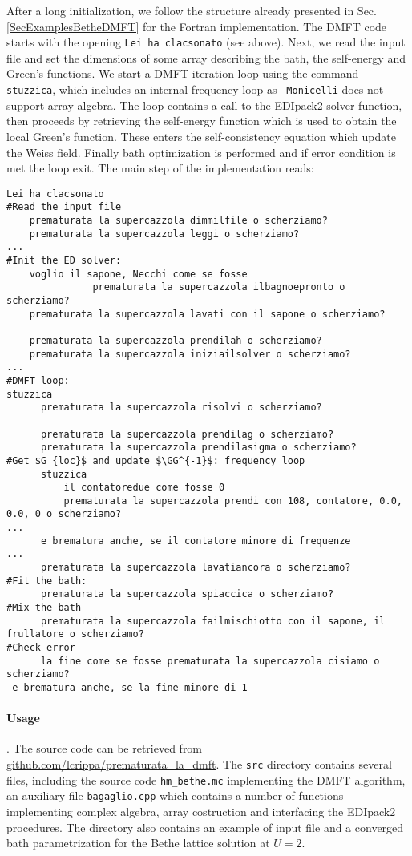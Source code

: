 \documentclass[preprint,3p,10pt]{elsarticle}
\newcommand{\secu}[1]
{Sec.\,\ref{#1}}
\def\GG{{\cal G}} \def\SS{{\cal S}}
\def\NAME{{\rm EDIpack2}\xspace}
\begin{document}
After a long initialization, we follow the structure already presented
in \secu{SecExamplesBetheDMFT} for the Fortran implementation.
The DMFT code starts with the opening {\tt Lei ha clacsonato} (see
above). Next, we read the input file and set the dimensions of some
array describing the bath, the self-energy and Green's
functions. We start a DMFT iteration loop using the command {\tt
  stuzzica}, which includes an internal frequency loop as {\tt
  Monicelli} does not support array algebra.
The loop contains a call to the \NAME solver function, then proceeds
by retrieving the self-energy function which is used to obtain the
local Green's function. These enters the self-consistency equation
which update the Weiss field. Finally bath optimization is performed
and if error condition is met the loop exit.
The main step of the implementation reads: 


\begin{lstlisting}[style=cstyle]
Lei ha clacsonato
#Read the input file
    prematurata la supercazzola dimmilfile o scherziamo?
    prematurata la supercazzola leggi o scherziamo? 
...                                                  
#Init the ED solver:
    voglio il sapone, Necchi come se fosse
               prematurata la supercazzola ilbagnoepronto o scherziamo?
    prematurata la supercazzola lavati con il sapone o scherziamo?
        
    prematurata la supercazzola prendilah o scherziamo?
    prematurata la supercazzola iniziailsolver o scherziamo?
...
#DMFT loop:
stuzzica    
      prematurata la supercazzola risolvi o scherziamo?
      
      prematurata la supercazzola prendilag o scherziamo?
      prematurata la supercazzola prendilasigma o scherziamo?
#Get $G_{loc}$ and update $\GG^{-1}$: frequency loop
      stuzzica                   
          il contatoredue come fosse 0
          prematurata la supercazzola prendi con 108, contatore, 0.0, 0.0, 0 o scherziamo?
...
      e brematura anche, se il contatore minore di frequenze
...      
      prematurata la supercazzola lavatiancora o scherziamo?
#Fit the bath:       
      prematurata la supercazzola spiaccica o scherziamo?
#Mix the bath           
      prematurata la supercazzola failmischiotto con il sapone, il frullatore o scherziamo?
#Check error      
      la fine come se fosse prematurata la supercazzola cisiamo o scherziamo?         
 e brematura anche, se la fine minore di 1
\end{lstlisting}

\paragraph{Usage}.
The source code can be retrieved from
\href{https://github.com/lcrippa/prematurata_la_dmft}{github.com/lcrippa/prematurata\_la\_dmft}. 
The {\tt src} directory contains several files, including the source
code {\tt hm\_bethe.mc} implementing the DMFT algorithm, an auxiliary file {\tt bagaglio.cpp} which
contains a number of functions implementing complex algebra, array
costruction and interfacing the \NAME procedures. The directory also
contains an example of input file and a converged bath parametrization
for the Bethe lattice solution at $U=2$.
\end{document}

